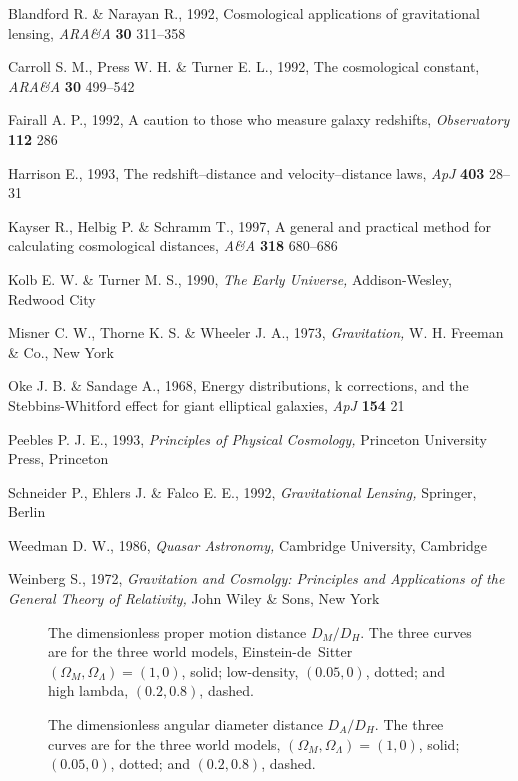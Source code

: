 \begin{references}
\item
Blandford R. \& Narayan R., 1992, Cosmological applications of
gravitational lensing, {\em ARA\&A\/} {\bf 30} 311--358
\item
Carroll S. M., Press W. H. \& Turner E. L., 1992, The cosmological
constant, {\em ARA\&A\/} {\bf 30} 499--542
\item
Fairall A. P., 1992, A caution to those who measure galaxy redshifts,
{\em Observatory\/} {\bf 112} 286
\item
Harrison E., 1993, The redshift--distance and velocity--distance laws,
{\em ApJ\/} {\bf 403} 28--31
\item
Kayser R., Helbig P. \& Schramm T., 1997, A general and practical
method for calculating cosmological distances, {\em A\&A\/} {\bf 318}
680--686
\item
Kolb E. W. \& Turner M. S., 1990, {\em The Early Universe,\/}
Addison-Wesley, Redwood City
\item
Misner C. W., Thorne K. S. \& Wheeler J. A., 1973, {\em Gravitation,}
W. H. Freeman \& Co., New York
\item
Oke J. B. \& Sandage A., 1968, Energy distributions, k corrections,
and the Stebbins-Whitford effect for giant elliptical galaxies, {\em
ApJ\/} {\bf 154} 21
\item
Peebles P. J. E., 1993, {\em Principles of Physical Cosmology,\/}
Princeton University Press, Princeton
\item
Schneider P., Ehlers J. \& Falco E. E., 1992, {\em Gravitational
Lensing,\/} Springer, Berlin
\item
Weedman D. W., 1986, {\em Quasar Astronomy,\/} Cambridge University,
Cambridge
\item
Weinberg S., 1972, {\em Gravitation and Cosmolgy: Principles and
Applications of the General Theory of Relativity,\/} John Wiley \&
Sons, New York
\end{references}


\clearpage
\begin{figure}
\caption[The dimensionless proper motion distance $D_M/D_H$.]{
The dimensionless proper motion distance $D_M/D_H$.  The three curves
are for the three world models, Einstein-de~Sitter
$(\Omega_M,\Omega_{\Lambda})=(1,0)$, solid; low-density, $(0.05,0)$,
dotted; and high lambda, $(0.2,0.8)$, dashed.}
\label{propmotdis}
\end{figure}

\begin{figure}
\caption[The dimensionless angular diameter distance $D_A/D_H$.]{
The dimensionless angular diameter distance $D_A/D_H$.  The three
curves are for the three world models,
$(\Omega_M,\Omega_{\Lambda})=(1,0)$, solid; $(0.05,0)$, dotted; and
$(0.2,0.8)$, dashed.}
\label{angdidis}
\end{figure}


